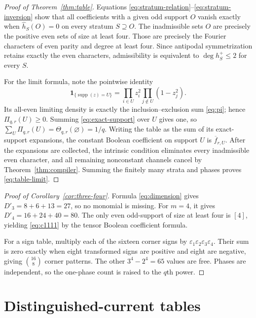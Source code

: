 \documentclass[11pt]{article}
\theoremstyle{definition}
\theoremstyle{remark}
\newcommand{\ind}{\mathbf 1}
\newcommand{\supp}{\operatorname{supp}}
\begin{document}
\begin{proof}[Proof of Theorem~\ref{thm:table}]
Equations \eqref{eq:stratum-relation}--\eqref{eq:stratum-inversion} show
that all coefficients with a given odd support \(O\) vanish exactly when
\(\widehat h_S(O)=0\) on every stratum \(S\supseteq O\).  The inadmissible
sets \(O\) are precisely the positive even sets of size at least four.
Those are precisely the Fourier characters of even parity and degree at
least four.  Since antipodal symmetrization retains exactly the even
characters, admissibility is equivalent to
\(\deg h_S^+\leq2\) for every \(S\).

For the limit formula, note the pointwise identity
\begin{equation}
 \ind_{\{\supp(z)=U\}}=
 \prod_{i\in U}z_i^2\prod_{j\notin U}(1-z_j^2).
 \label{eq:exact-support}
\end{equation}
Its all-even limiting density is exactly the inclusion--exclusion sum
\eqref{eq:pi}; hence \(\Pi_{q,r}(U)\geq0\).  Summing
\eqref{eq:exact-support} over \(U\) gives one, so
\(\sum_U\Pi_{q,r}(U)=\Theta_{q,r}(\varnothing)=1/q\).  Writing the table
as the sum of its exact-support expansions, the constant
Boolean coefficient on support \(U\) is \(\overline f_{r,U}\).  After the
expansions are collected, the intrinsic condition eliminates every
inadmissible even character, and all remaining nonconstant channels cancel
by Theorem~\ref{thm:compiler}.  Summing the finitely many strata and phases
proves
\eqref{eq:table-limit}.
\end{proof}

\begin{proof}[Proof of Corollary~\ref{cor:three-four}]
Formula \eqref{eq:dimension} gives \(D'_3=8+6+13=27\), so no monomial is
missing.  For \(m=4\), it gives \(D'_4=16+24+40=80\).  The only even
odd-support of size at least four is \([4]\), yielding
\eqref{eq:c1111} by the tensor Boolean coefficient formula.

For a sign table, multiply each of the sixteen corner signs by
\(\varepsilon_1\varepsilon_2\varepsilon_3\varepsilon_4\).  Their sum is
zero exactly when eight transformed signs are positive and eight are
negative, giving \(\binom{16}{8}\) corner patterns.  The other
\(3^4-2^4=65\) values are free.  Phases are independent, so the one-phase
count is raised to the \(q\)th power.
\end{proof}

\section{Distinguished-current tables}
\end{document}

